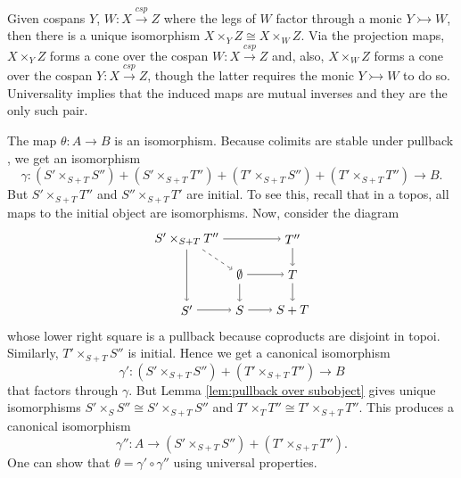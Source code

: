 \documentclass{tac}
\newcommand{\from}{\colon}
\newcommand{\cospan}{\xrightarrow{\mathit{csp}}}
\begin{document}
\lemma \label{lem:pullback over subobject}
	Given cospans 
		$ Y $, $ W \from X \cospan Z $ 
	where the legs of $W$ factor through a monic 
		$Y \rightarrowtail W $, 
	then there is a unique isomorphism 
		$ X \times_Y Z \cong X \times_W Z $. 
\endlemma
\proof
	Via the projection maps, 
		$X \times_Y Z$ 
	forms a cone over the cospan 
		$ W \from X \cospan Z $ 
	and, also, $X \times_W Z$ forms a 
	cone over the cospan 
		$ Y \from X \cospan Z $, 
	though the latter requires the monic 
		$ Y \rightarrowtail W $ 
	to do so. Universality implies that the 
	induced maps are mutual inverses and 
	they are the only such pair.  
\endproof

\lemma \label{lem.Theta Iso}
	The map $\theta \from A \to B$ is an isomorphism.
\endlemma
\proof
	Because colimits are stable under pullback 
		\cite[Thm.~4.7.2]{MacLaneMoerdijk_SheavesGeomLogic}, 
	we get an isomorphism
	\[
		\gamma \from 
			( S'\times_{ S + T } S'' ) +
			( S'\times_{ S + T } T'' ) +
			( T'\times_{ S + T } S'' ) +
			( T'\times_{ S + T } T'' ) 
			\to B.
	\]
	But 
		$ S' \times_{ S + T } T'' $ 
	and 
		$ S'' \times_{ S + T } T' $ 
	are initial. To see this, recall that in a topos, 
	all maps to the initial object are isomorphisms. 
	Now, consider the diagram
	\[
		\begin{tikzpicture}
		\node (STpb) at (0,2) {$S' \times_{S+T} T''$};
		\node (T'') at (3,2) {$T''$};
		\node (0) at (1.5,1) {$\emptyset$};
		\node (T) at (3,1) {$T$};
		\node (S') at (0,0) {$S'$};
		\node (S) at (1.5,0) {$S$};
		\node (ST) at (3,0) {$S+T$};
		\draw [->] (STpb) edge (S');
		\draw [->] (STpb) edge (T'');
		\draw [->] (STpb) edge[dashed] (0);
		\draw [->] (0) edge (S);
		\draw [->] (0) edge (T);
		\draw [->] (S) edge (ST);
		\draw [->] (T) edge (ST);
		\draw [->] (S') edge (S);
		\draw [->] (T'') edge (T);
		\end{tikzpicture}
	\]
	whose lower right square is a pullback because 
	coproducts are disjoint in topoi.  Similarly, 
		$ T' \times_{ S + T } S'' $ 
	is initial.  Hence we get a canonical isomorphism
		\begin{equation} \label{eq:B second iso}
			\gamma' \from 
			( S' \times_{ S + T } S'' ) + ( T' \times_{ S + T } T'' ) 
			\to B
		\end{equation}
	that factors through $\gamma$. But Lemma 
		\ref{lem:pullback over subobject} 
	gives unique isomorphisms 
		$ S' \times_{ S } S'' \cong S' \times_{ S + T } S''$ 
	and 
		$ T' \times_{ T } T'' \cong T' \times_{ S + T } T''$. 
	This produces a canonical isomorphism 
	\[
		\gamma'' \from 
			A \to ( S' \times_{ S + T } S'' ) + ( T' \times_{ S + T } T'' ).
	\]
	One can show that 
		$ \theta = \gamma' \circ \gamma'' $ 
	using universal properties.  
\endproof
\end{document}
